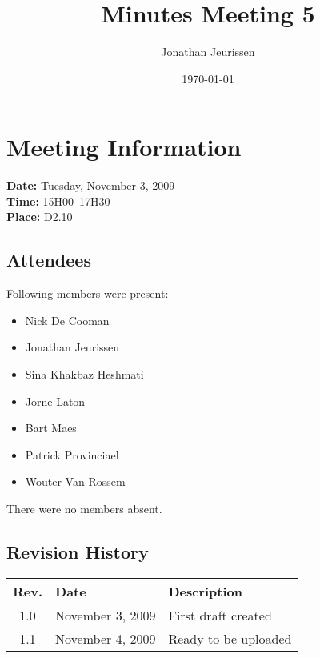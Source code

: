 \documentclass[a4paper, 12pt]{article}
\begin{document}
\title{Minutes Meeting 5}
\author{Jonathan Jeurissen}
\date{\today}

\maketitle	
	\section{Meeting Information}
			\textbf{Date:} Tuesday, November 3, 2009\\
			\textbf{Time:} 15H00--17H30\\
			\textbf{Place:} D2.10\\
		\subsection{Attendees}
Following members were present:
			\begin{itemize}
				\item Nick De Cooman
				\item Jonathan Jeurissen
				\item Sina Khakbaz Heshmati
				\item Jorne Laton
				\item Bart Maes
				\item Patrick Provinciael
				\item Wouter Van Rossem
			\end{itemize}
There were no members absent.
		\subsection{Revision History}
			\begin{tabular}{c | l | l }
				\textbf{Rev.} & \textbf{Date} & \textbf{Description} \\
				\hline
				1.0 & November 3, 2009 & First draft created \\
				1.1 & November 4, 2009 & Ready to be uploaded \\
			\end{tabular}		
\end{document}
